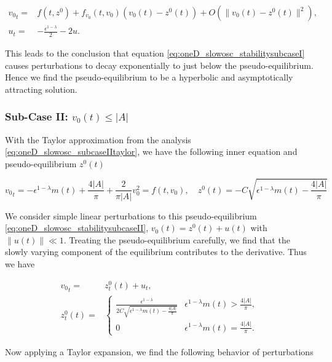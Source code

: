 \begin{equation*}
\begin{aligned}
{v_0}_t =& f(t,z^0)+f_{v_0}(t,v_0)(v_0(t)-z^0(t))+O(\lVert v_0(t)-z^0(t) \rVert^2),\\
u_t =&-\frac{\epsilon^{1-\lambda}}{2}-2u.
\end{aligned}
\end{equation*}

This leads to the conclusion that equation \eqref{eq:oneD_slowosc_stabilitysubcaseI} causes perturbations to decay exponentially to just below the pseudo-equilibrium. Hence we find the pseudo-equilibrium to be a hyperbolic and asymptotically attracting solution.

\subsubsection*{Sub-Case II: $v_0(t)\le |A|$}

With the Taylor approximation from the analysis \eqref{eq:oneD_slowosc_subcaseIItaylor}, we have the following inner equation and pseudo-equilibrium $z^0(t)$

\begin{equation}\label{eq:oneD_slowosc_stabilitysubcaseII}
{v_0}_t= -\epsilon^{1-\lambda}m(t) +\frac{4|A|}{\pi}+\frac{2}{\pi |A|}v_0^2=f(t,v_0),\quad z^0(t)=-C \sqrt{\epsilon^{1-\lambda}m(t)-\frac{4|A|}{\pi}}
\end{equation}

We consider simple linear perturbations to this pseudo-equilibrium \eqref{eq:oneD_slowosc_stabilitysubcaseII}, $v_0(t)=z^0(t)+u(t)$ with $\lVert u(t) \rVert \ll 1$. Treating the pseudo-equilibrium carefully, we find that the slowly varying component of the equilibrium contributes to the derivative. Thus we have

\begin{equation}
\begin{aligned}
{v_0}_t =& z^0_t(t) +u_t,\\
z^0_t(t) = & \begin{cases}
\frac{\epsilon^{1-\lambda}}{2C\sqrt{\epsilon^{1-\lambda}m(t)-\frac{4|A|}{\pi}}} & \epsilon^{1-\lambda}m(t)> \frac{4|A|}{\pi},\\
0 & \epsilon^{1-\lambda}m(t) =\frac{4|A|}{\pi}.
\end{cases}
\end{aligned}
\end{equation}

Now applying a Taylor expansion, we find the following behavior of perturbations

